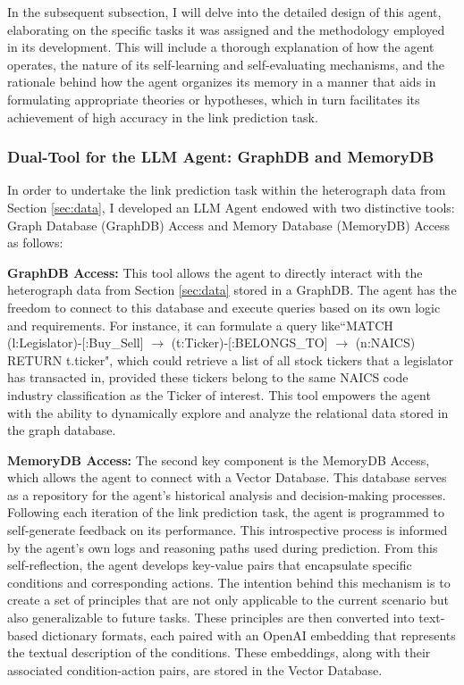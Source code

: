 \documentclass[15pt,letterpaper]{article}
\begin{document}
In the subsequent subsection, 
I will delve into the detailed design of this agent, elaborating on the specific tasks it was assigned and the methodology employed in its development. 
This will include a thorough explanation of how the agent operates, 
the nature of its self-learning and self-evaluating mechanisms, and the 
rationale behind how the agent organizes its memory in a manner that 
aids in formulating appropriate theories or hypotheses, 
which in turn facilitates its achievement of high accuracy in the link prediction task.


\subsubsection{Dual-Tool for the LLM Agent: GraphDB and MemoryDB}

In order to undertake the link prediction task within the heterograph data from Section \ref{sec:data}, I developed an LLM Agent endowed with two distinctive tools: Graph Database (GraphDB) Access and Memory Database (MemoryDB) Access as follows: 

\textbf{GraphDB Access:} This tool allows the agent to directly interact with the heterograph data from Section \ref{sec:data} stored in a GraphDB. The agent has the freedom to connect to this database and execute queries based on its own logic and requirements. For instance, it can formulate a query like``MATCH (l:Legislator)-[:Buy\_Sell] $\rightarrow$ (t:Ticker)-[:BELONGS\_TO] $\rightarrow$ (n:NAICS) 
RETURN t.ticker", which could retrieve a list of all stock tickers that a legislator has transacted in, provided these tickers belong to the same NAICS code industry classification as the Ticker of interest. This tool empowers the agent with the ability to dynamically explore and analyze the relational data stored in the graph database.

\textbf{MemoryDB Access:} The second key component is the MemoryDB Access, which allows the agent to connect with a Vector Database. This database serves as a repository for the agent's historical analysis and decision-making processes. Following each iteration of the link prediction task, the agent is programmed to self-generate feedback on its performance. This introspective process is informed by the agent's own logs and reasoning paths used during prediction.
From this self-reflection, the agent develops key-value pairs that encapsulate specific conditions and corresponding actions. The intention behind this mechanism is to create a set of principles that are not only applicable to the current scenario but also generalizable to future tasks. These principles are then converted into text-based dictionary formats, each paired with an OpenAI embedding that represents the textual description of the conditions. These embeddings, along with their associated condition-action pairs, are stored in the Vector Database.
\end{document}
